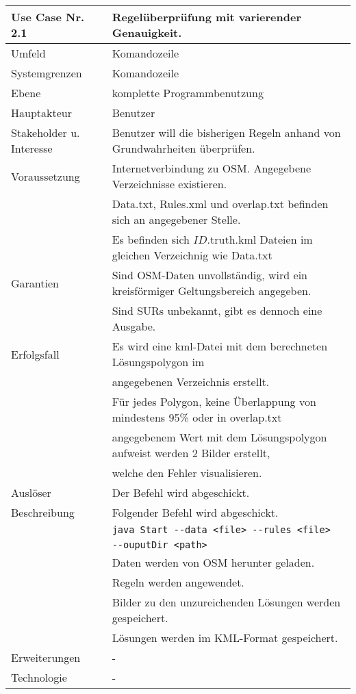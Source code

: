 \begin{tabular}{| l | l |}
 \hline
 \textbf{Use Case Nr. 2.1} & Regelüberprüfung mit varierender Genauigkeit.\\
 \hline
 Umfeld & Komandozeile\\
 \hline
 Systemgrenzen & Komandozeile\\
 \hline
 Ebene & komplette Programmbenutzung\\
 \hline
 Hauptakteur & Benutzer\\
 \hline
 Stakeholder u. Interesse & Benutzer will die bisherigen Regeln anhand von Grundwahrheiten überprüfen.\\
 \hline
 Voraussetzung & Internetverbindung zu OSM. Angegebene Verzeichnisse existieren.\\
        & Data.txt, Rules.xml und overlap.txt befinden sich an angegebener Stelle. \\
        & Es befinden sich $ID$.truth.kml Dateien im gleichen Verzeichnig wie Data.txt \\
 \hline
 Garantien & Sind OSM-Daten unvollständig, wird ein kreisförmiger Geltungsbereich angegeben.\\
    & Sind SURs unbekannt, gibt es dennoch eine Ausgabe.\\
 \hline
 Erfolgsfall & Es wird eine kml-Datei mit dem berechneten Lösungspolygon im\\
      & angegebenen Verzeichnis erstellt.\\
      & Für jedes Polygon, keine Überlappung von mindestens 95\% oder in overlap.txt \\
      & angegebenem Wert mit dem Lösungspolygon aufweist werden 2 Bilder erstellt,\\
      & welche den Fehler visualisieren.\\
 \hline
 Auslöser & Der Befehl wird abgeschickt.\\
 \hline
 Beschreibung & Folgender Befehl wird abgeschickt.\\
      & \verb|java Start --data <file> --rules <file>|\\
      & \hspace{24pt} \verb|--ouputDir <path>|\\
      & Daten werden von OSM herunter geladen.\\
      & Regeln werden angewendet.\\
      & Bilder zu den unzureichenden Lösungen werden gespeichert.\\
      & Lösungen werden im KML-Format gespeichert.\\
 \hline
 Erweiterungen & -\\
 \hline
 Technologie & -\\
 \hline
\end{tabular}


